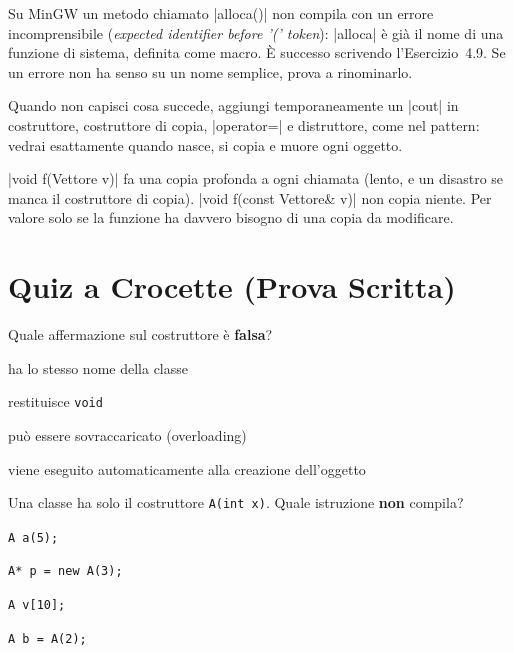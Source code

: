 \begin{trappola}
Su MinGW un metodo chiamato \cc|alloca()| non compila con un errore
incomprensibile (\emph{expected identifier before '(' token}): \cc|alloca| è già il
nome di una funzione di sistema, definita come macro. È successo scrivendo
l'Esercizio~4.9. Se un errore non ha senso su un nome semplice, prova a rinominarlo.
\end{trappola}

\begin{consiglio}
Quando non capisci cosa succede, aggiungi temporaneamente un \cc|cout| in
costruttore, costruttore di copia, \cc|operator=| e distruttore, come nel pattern:
vedrai esattamente quando nasce, si copia e muore ogni oggetto.
\end{consiglio}

\begin{consiglio}
\cc|void f(Vettore v)| fa una copia profonda a ogni chiamata (lento, e un disastro se
manca il costruttore di copia). \cc|void f(const Vettore& v)| non copia niente.
Per valore solo se la funzione ha davvero bisogno di una copia da modificare.
\end{consiglio}

\section{Quiz a Crocette (Prova Scritta)}

\begin{quiz}{Quale affermazione sul costruttore è \textbf{falsa}?}
  \item ha lo stesso nome della classe
  \item restituisce \texttt{void}
  \item può essere sovraccaricato (overloading)
  \item viene eseguito automaticamente alla creazione dell'oggetto
\end{quiz}

\begin{quiz}{Una classe ha solo il costruttore \texttt{A(int x)}. Quale istruzione \textbf{non} compila?}
  \item \texttt{A a(5);}
  \item \texttt{A* p = new A(3);}
  \item \texttt{A v[10];}
  \item \texttt{A b = A(2);}
\end{quiz}

